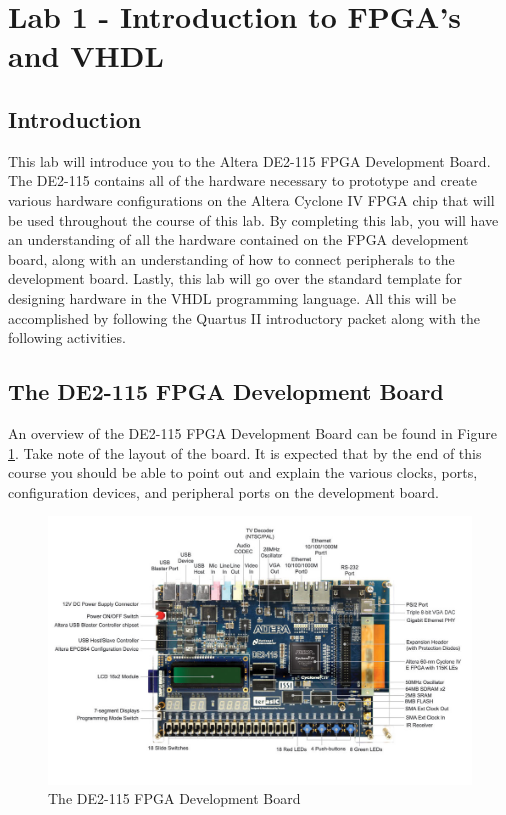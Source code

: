 \section{Lab 1 - Introduction to FPGA's and VHDL}

\subsection{Introduction}
This lab will introduce you to the Altera DE2-115 FPGA Development Board. The DE2-115 contains all of the hardware necessary to prototype and create various hardware configurations on the Altera Cyclone IV FPGA chip that will be used throughout the course of this lab. By completing this lab, you will have an understanding of all the hardware contained on the FPGA development board, along with an understanding of how to connect peripherals to the development board. Lastly, this lab will go over the standard template for designing hardware in the VHDL programming language. All this will be accomplished by following the Quartus II introductory packet along with the following activities.

\subsection{The DE2-115 FPGA Development Board}
An overview of the DE2-115 FPGA Development Board can be found in Figure \ref{fig:DE2-115}. Take note of the layout of the board. It is expected that by the end of this course you should be able to point out and explain the various clocks, ports, configuration devices, and peripheral ports on the development board.

\begin{figure}[H]
	\centering
	\includegraphics[width=170mm]{Lab1/figures/DE2-115.jpg}
	\caption{The DE2-115 FPGA Development Board}
	\label{fig:DE2-115}
\end{figure}

